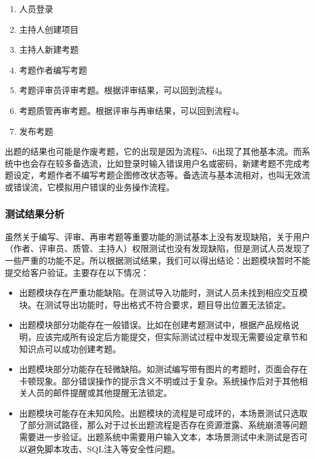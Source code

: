 \documentclass[hyperref, a4paper]{ctexart}
\begin{document}
\begin{enumerate}
\def\labelenumi{\arabic{enumi}.}
\item
  人员登录
\item
  主持人创建项目
\item
  主持人新建考题
\item
  考题作者编写考题
\item
  考题评审员评审考题。根据评审结果，可以回到流程4。
\item
  考题质管再审考题。根据评审与再审结果，可以回到流程4。
\item
  发布考题
\end{enumerate}

出题的结果也可能是作废考题，它的出现是因为流程5、6出现了其他基本流。而系统中也会存在较多备选流，比如登录时输入错误用户名或密码，新建考题不完成考题设定，考题作者不编写考题企图修改状态等。备选流与基本流相对，也叫无效流或错误流，它模拟用户错误的业务操作流程。

\hypertarget{ux6d4bux8bd5ux7ed3ux679cux5206ux6790}{%
\subsubsection{测试结果分析}\label{ux6d4bux8bd5ux7ed3ux679cux5206ux6790}}

虽然关于编写、评审、再审考题等重要功能的测试基本上没有发现缺陷，关于用户（作者、评审员、质管、主持人）权限测试也没有发现缺陷，但是测试人员发现了一些严重的功能不足。所以根据测试结果，我们可以得出结论：出题模块暂时不能提交给客户验证。主要存在以下情况：

\begin{itemize}
\item
  出题模块存在严重功能缺陷。在测试导入功能时，测试人员未找到相应交互模块。在测试导出功能时，导出格式不符合要求，题目导出位置无法锁定。
\item
  出题模块部分功能存在一般错误。比如在创建考题测试中，根据产品规格说明，应该完成所有设定后方能提交，但实际测试过程中发现无需要设定章节和知识点可以成功创建考题。
\item
  出题模块部分功能存在轻微缺陷。如测试编写带有图片的考题时，页面会存在卡顿现象。部分错误操作的提示含义不明或过于复杂。系统操作后对于其他相关人员的邮件提醒或其他提醒无法锁定。
\item
  出题模块可能存在未知风险。出题模块的流程是可成环的，本场景测试只选取了部分测试路径，那么对于过长出题流程是否存在资源泄露、系统崩溃等问题需要进一步验证。出题系统中需要用户输入文本，本场景测试中未测试是否可以避免脚本攻击、SQL注入等安全性问题。
\end{itemize}
\end{document}
